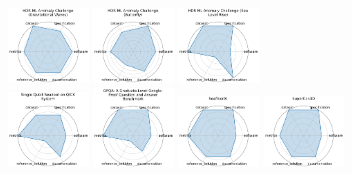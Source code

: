 \begin{figure}[ht!]
\includegraphics[width=0.1900\textwidth]{images/hdr_ml_anomaly_challenge_gravitational_waves_radar.pdf}
\includegraphics[width=0.1900\textwidth]{images/hdr_ml_anomaly_challenge_butterfly_radar.pdf}
\includegraphics[width=0.1900\textwidth]{images/hdr_ml_anomaly_challenge_sea_level_rise_radar.pdf}
\\[1ex]
\includegraphics[width=0.1900\textwidth]{images/single_qubit_readout_on_qick_system_radar.pdf}
\includegraphics[width=0.1900\textwidth]{images/gpqa_a_graduate-level_google-proof_question_and_answer_benchmark_radar.pdf}
\includegraphics[width=0.1900\textwidth]{images/seafloorai_radar.pdf}
\includegraphics[width=0.1900\textwidth]{images/supercond_radar.pdf}

\end{figure}
